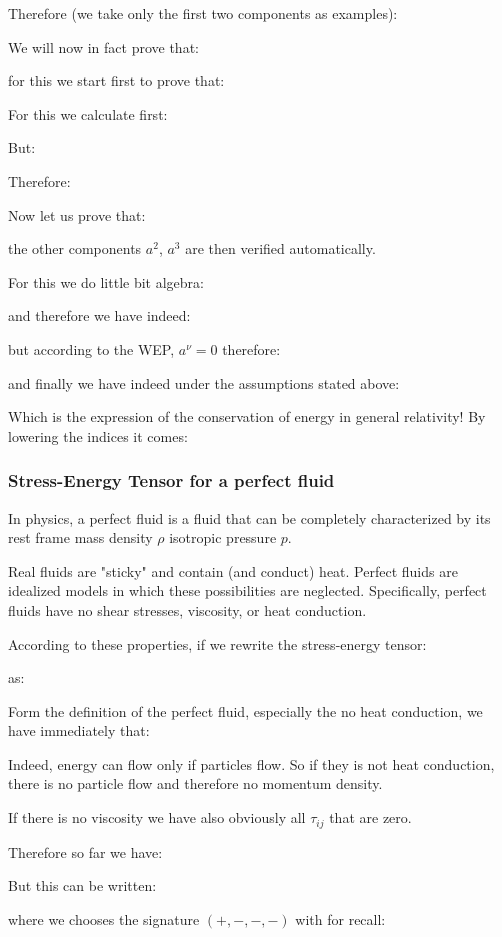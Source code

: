	Therefore (we take only the first two components as examples):
	
	We will now in fact prove that:
	
	for this we start first to prove that:
	
	For this we calculate first:
	
	But:
	
	Therefore:
	
	Now let us prove that:
	
	the other components $a^2$, $a^3$ are then verified automatically.

	For this we do little bit algebra:
	
	and therefore we have indeed:
	
	but according to the WEP, $a^\nu=0$ therefore:
	
	and finally we have indeed under the assumptions stated above:
	
	Which is the expression of the conservation of energy in general relativity! By lowering the indices it comes:
	
	
	\subsubsection{Stress-Energy Tensor for a perfect fluid}
	In physics, a perfect fluid is a fluid that can be completely characterized by its rest frame mass density $\rho$ isotropic pressure $p$.
	
	Real fluids are "sticky" and contain (and conduct) heat. Perfect fluids are idealized models in which these possibilities are neglected. Specifically, perfect fluids have no shear stresses, viscosity, or heat conduction.
	
	According to these properties, if we rewrite the stress-energy tensor:
	
	as:
	
	Form the definition of the perfect fluid, especially the no heat conduction, we have immediately that:
	
	Indeed, energy can flow only if particles flow. So if they is not heat conduction, there is no particle flow and therefore no momentum density.
	
	If there is no viscosity we have also obviously all $\tau_{ij}$ that are zero.
	
	Therefore so far we have:
	
	But this can be written:
	
	where we chooses the signature $(+, -, -, -)$ with for recall:
	
